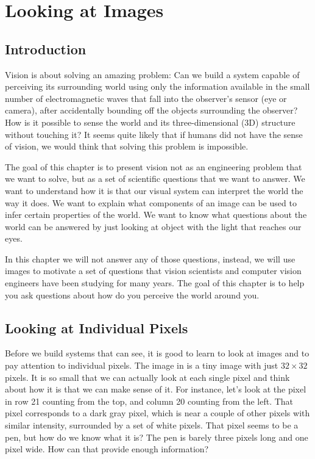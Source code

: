 %	
%	
%	 
%



\chapter{Looking at Images}
\label{chap:looking_at_images}

\section{Introduction}

Vision is about solving an amazing problem: Can we build a system capable of perceiving its surrounding world using only the information available in the small number of electromagnetic waves that fall into the observer’s sensor (eye or camera), after accidentally bounding off the objects surrounding the observer? How is it possible to sense the world and its three-dimensional (3D) structure without touching it? It seems quite likely that if humans did not have the sense of vision, we would think that solving this problem is impossible. 

The goal of this chapter is to present vision not as an engineering problem that we want to solve, but as a set of scientific questions that we want to answer. We want to understand how it is that our visual system can interpret the world the way it does. We want to explain what components of an image can be used to infer certain properties of the world. We want to know what questions about the world can be answered by just looking at object with the light that reaches our eyes. 

In this chapter we will not answer any of those questions, instead, we will use images to motivate a set of questions that vision scientists and computer vision engineers have been studying for many years. The goal of this chapter is to help you ask questions about how do you perceive the world around you. 

\section{Looking at Individual Pixels}


Before we build systems that can see, it is good to learn to look at images and to pay attention to individual pixels.
The image in \fig{\ref{fig:pexels-retha-ferguson}} is a tiny image with just $32 \times 32$ pixels. 
It is so small that we can actually look at each single pixel and think about how it is that we can make sense of it. For instance, let's look at the pixel in row 21 counting from the top, and column 20 counting from the left. That pixel corresponds to a dark gray pixel, which is near a couple of other pixels with similar intensity, surrounded by a set of white pixels. That pixel seems to be a pen, but how do we know what it is? The pen is barely three pixels long and one pixel wide. How can that provide enough information? 

